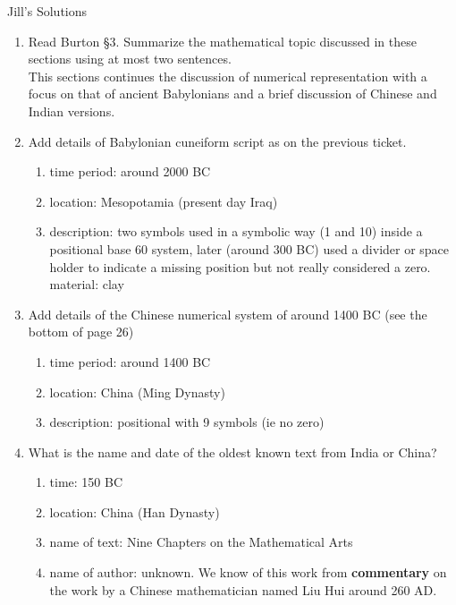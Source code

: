 \documentclass[12pt]{article}
\renewcommand{\emph}[1]{\textsf{\textbf{#1}}}
\begin{document}
\begin{center}{Jill's Solutions}\end{center}
\begin{enumerate}
\item Read Burton \S 3. Summarize the mathematical topic discussed in these sections using at most two sentences.\\

This sections continues the discussion of numerical representation with a focus on that of ancient Babylonians and a brief discussion of Chinese and Indian versions.\\

\item Add details of Babylonian cuneiform script as on the previous ticket.
	\begin{enumerate}
	\item time period: around 2000 BC
	\item location: Mesopotamia (present day Iraq)
	\item description: two symbols used in a symbolic way (1 and 10) inside a positional base 60 system, later (around 300 BC) used a divider or space holder to indicate a missing position but not really considered a zero. material: clay
	\end{enumerate}
\vfill
	
\item Add details of the Chinese numerical system of around 1400 BC (see the bottom of page 26)
	\begin{enumerate}
	\item time period: around 1400 BC
	\item location: China (Ming Dynasty)
	\item description: positional with 9 symbols (ie no zero)
	\end{enumerate}
\vfill
	
\item What is the name and date of the oldest known text from India or China?
	\begin{enumerate}
	\item time: 150 BC
	\item location: China (Han Dynasty)
	\item name of text: Nine Chapters on the Mathematical Arts
	\item name of author: unknown. We know of this work from \emph{commentary} on the work by a Chinese mathematician named Liu Hui around 260 AD. 
	\end{enumerate}
		

\end{enumerate}
\end{document}
